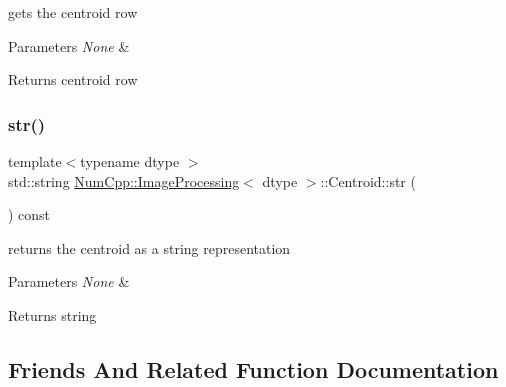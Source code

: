 gets the centroid row


\begin{DoxyParams}{Parameters}
{\em None} & \\
\hline
\end{DoxyParams}
\begin{DoxyReturn}{Returns}
centroid row 
\end{DoxyReturn}
\mbox{\label{class_num_cpp_1_1_image_processing_1_1_centroid_a6ba12d36817c5c9385c974e2fedb5de8}} 
\subsubsection{\texorpdfstring{str()}{str()}}
{\footnotesize\ttfamily template$<$typename dtype $>$ \\
std\+::string \mbox{\hyperlink{class_num_cpp_1_1_image_processing}{Num\+Cpp\+::\+Image\+Processing}}$<$ dtype $>$\+::Centroid\+::str (\begin{DoxyParamCaption}{ }\end{DoxyParamCaption}) const\hspace{0.3cm}{\ttfamily [inline]}}

returns the centroid as a string representation


\begin{DoxyParams}{Parameters}
{\em None} & \\
\hline
\end{DoxyParams}
\begin{DoxyReturn}{Returns}
string 
\end{DoxyReturn}


\subsection{Friends And Related Function Documentation}
\mbox{\label{class_num_cpp_1_1_image_processing_1_1_centroid_a5313d8a6a2d6a5fde55a8457650c54d3}} 
